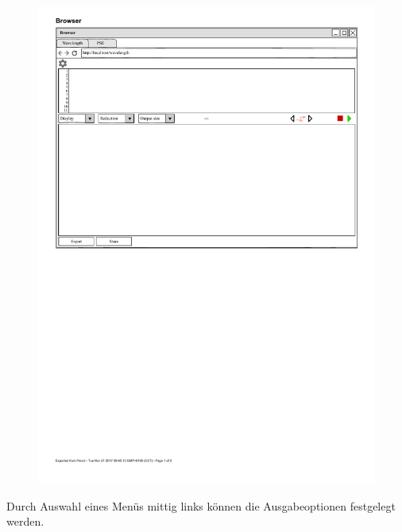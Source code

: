 \documentclass[parskip=full,11pt,twoside]{scrartcl}
\begin{document}
\begin{figure}[H]
	\centering
	\includegraphics{img/actionButton}
\end{figure}

Durch Auswahl eines Menüs mittig links können die Ausgabeoptionen festgelegt werden. 
\end{document}
